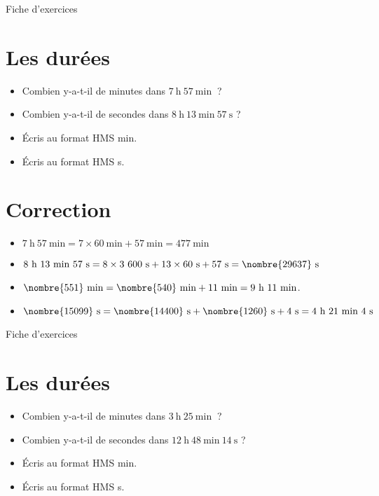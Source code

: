 \documentclass[a4paper,11pt,fleqn]{article}
\begin{document}
\pagestyle{empty}


\begin{center}
	{\huge Fiche d'exercices } 	
\end{center}


\section{Les durées}
\begin{itemize}
  \item Combien y-a-t-il de minutes dans $7~\text{h}~57~\text{min}~$ ?
  \item Combien y-a-t-il de secondes dans $8~\text{h}~13~\text{min}~57~\text{s}$ ?
  \item Écris au format HMS  min.
  \item Écris au format HMS  s.
\end{itemize}

\section{Correction}
\begin{itemize}
 \item $7~\text{h}~57~\text{min}=7\times60~\text{min}+57~\text{min}=477~\text{min}$
  \item $8~\text{h}~13~\text{min}~57~\text{s}=8\times3~600~\text{s}+13\times60~\text{s}+57~\text{s}=\nombre{29637}~\text{s}$
  \item $\nombre{551}~\text{min}=\nombre{540}~\text{min}+11~\text{min}=9~\text{h}~11~\text{min}$.
  \item $\nombre{15099}~\text{s}=\nombre{14400}~\text{s}+\nombre{1260}~\text{s}+4~\text{s}=4~\text{h}~21~\text{min}~4~\text{s}$ \end{itemize}


\newpage
\setcounter{exo}{0}
\setcounter{section}{0}
\begin{center}
	{\huge Fiche d'exercices } 	
\end{center}


\section{Les durées}
\begin{itemize}
  \item Combien y-a-t-il de minutes dans $3~\text{h}~25~\text{min}~$ ?
  \item Combien y-a-t-il de secondes dans $12~\text{h}~48~\text{min}~14~\text{s}$ ?
  \item Écris au format HMS  min.
  \item Écris au format HMS  s.
\end{itemize}
\end{document}
